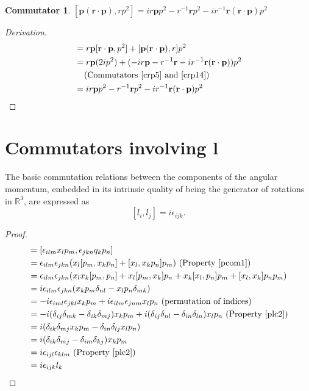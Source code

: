 \documentclass[12pt,a4paper]{report}
\theoremstyle{definition}
\newtheorem{commutator}{Commutator}[section]
\newenvironment{derivation}
  {\renewcommand\qedsymbol{$\square$}\begin{proof}[Derivation]}
  {\end{proof}}
\theoremstyle{remark}
\theoremstyle{remark}
\begin{document}
\begin{appendices}
\begin{commutator}\label{crp15}
$[\textbf{p}(\textbf{r}\cdot\textbf{p}),rp^2]=ir\textbf{p}p^2-r^{-1}\textbf{r}p^2-ir^{-1}\textbf{r}(\textbf{r}\cdot\textbf{p})p^2$
\end{commutator}
\begin{derivation}
\begin{align*}
[\textbf{p}(\textbf{r}\cdot\textbf{p}),rp^2]&=r\textbf{p}[\textbf{r}\cdot\textbf{p},p^2]+[\textbf{p}(\textbf{r}\cdot\textbf{p}),r]p^2\\
&=r\textbf{p}(2ip^2)+(-ir\textbf{p}-r^{-1}\textbf{r}-ir^{-1}\textbf{r}(\textbf{r}\cdot\textbf{p}))p^2\\
&\phantom{=}\text{ (Commutators~\ref{crp5} and~\ref{crp14})}\\
&=ir\textbf{p}p^2-r^{-1}\textbf{r}p^2-ir^{-1}\textbf{r}(\textbf{r}\cdot\textbf{p})p^2
\end{align*}
\end{derivation}

\section{Commutators involving $\mathbf{l}$}
The basic commutation relations between the components of the angular momentum, embedded in its intrinsic quality of being the generator of rotations in $\mathbb{R}^3$, are expressed as
\begin{equation}\label{el1}
[l_i,l_j]=i\epsilon_{ijk}.
\end{equation}
\begin{proof}
\begin{align*}
[l_i,l_j] &= [\epsilon_{ilm}x_lp_m,\epsilon_{jkn}q_kp_n] \\
&= \epsilon_{ilm}\epsilon_{jkn}(x_l[p_m,x_kp_n]+[x_l,x_kp_n]p_m) \text{ (Property~\ref{pcom1})} \\
&= \epsilon_{ilm}\epsilon_{jkn}(x_lx_k[p_m,p_n]+x_l[p_m,x_k]p_n+x_k[x_l,p_n]p_m+[x_l,x_k]p_np_m) \\
&= i\epsilon_{ilm}\epsilon_{jkn}(x_kp_m\delta_{nl}-x_lp_n\delta_{mk}) \\
&= -i\epsilon_{iml}\epsilon_{jkl}x_kp_m+i\epsilon_{ilm}\epsilon_{jnm}x_lp_n \text{ (permutation of indices)} \\
&= -i(\delta_{ij}\delta_{mk}-\delta_{ik}\delta_{mj})x_kp_m+i(\delta_{ij}\delta_{nl}-\delta_{in}\delta_{ln})x_lp_n \text{ (Property~\ref{plc2})} \\
&= i(\delta_{ik}\delta_{mj}x_kp_m-\delta_{in}\delta_{lj}x_lp_n) \\
&= i(\delta_{ik}\delta_{mj}-\delta_{im}\delta_{kj})x_kp_m \\
&= i\epsilon_{ijl}\epsilon_{klm} \text{ (Property~\ref{plc2})} \\
&= i\epsilon_{ijk}l_k
\end{align*}
\end{proof}


\end{appendices}
\end{document}
